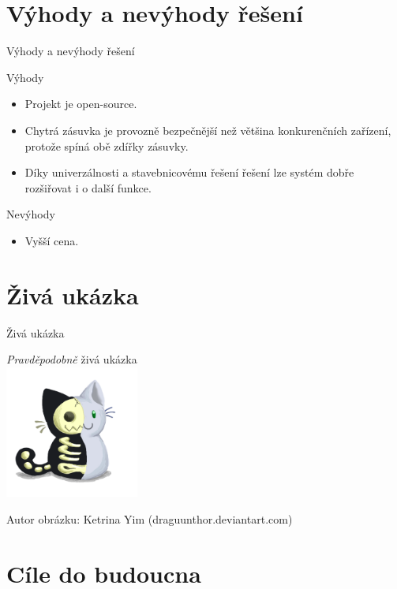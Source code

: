 \documentclass[11pt]{beamer}
\begin{document}
\section{Výhody a nevýhody řešení}

\begin{frame}{Výhody a nevýhody řešení}
  \begin{exampleblock}{Výhody}
    \begin{itemize}
      \item Projekt je open-source.
      \item Chytrá zásuvka je provozně bezpečnější než většina konkurenčních zařízení, protože spíná obě zdířky zásuvky.
      \item Díky univerzálnosti a stavebnicovému řešení řešení lze systém dobře rozšiřovat i o další funkce.
    \end{itemize}
  \end{exampleblock}
  \begin{alertblock}{Nevýhody}
    \begin{itemize}
      \item Vyšší cena.
    \end{itemize}
  \end{alertblock}
\end{frame}

\section{Živá ukázka}
\begin{frame}{Živá ukázka}
  \begin{center}
    \huge{\textit{Pravděpodobně} živá ukázka} \\
    \vspace{8mm}
    \includegraphics[width = 0.33\textwidth]{../img/kocka.png}
    \vspace{8mm}
  \end{center}
  \small{Autor obrázku: Ketrina Yim (draguunthor.deviantart.com)}
\end{frame}

\section{Cíle do budoucna}
\end{document}
